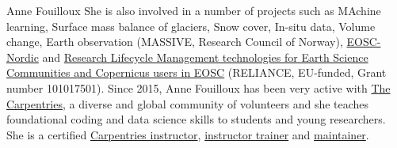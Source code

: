 \begin{participant}[gender=female]{Anne Fouilloux}
She is also involved in a number of projects such as MAchine learning, Surface mass balance of glaciers, Snow cover, In-situ data, Volume change, Earth observation (MASSIVE, Research Council of Norway), \href{https://www.eosc-nordic.eu/}{EOSC-Nordic} and \href{https://www.reliance-project.eu/}{Research Lifecycle Management technologies for Earth Science Communities and Copernicus users in EOSC} (RELIANCE, EU-funded, Grant number 101017501).
   Since 2015, Anne Fouilloux has been very active with \href{https://carpentries.org}{The Carpentries}, a diverse and global community of volunteers and she teaches foundational coding and data science skills to students and young researchers. She is a certified \href{https://carpentries.org/instructors/}{Carpentries instructor}, \href{https://carpentries.org/trainers/}{instructor trainer} and \href{https://carpentries.org/maintainers/}{maintainer}. 
   
\end{participant}

